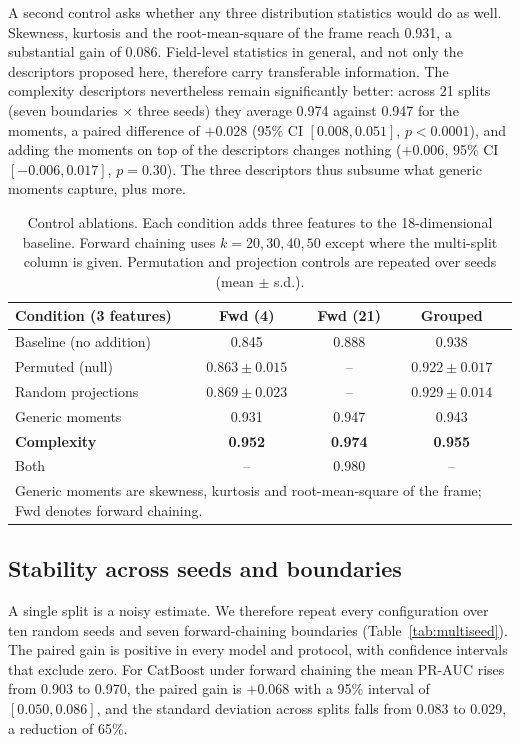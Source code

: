 \documentclass[preprint,12pt]{elsarticle}
\begin{document}
A second control asks whether any three distribution statistics would do as well. Skewness,
kurtosis and the root-mean-square of the frame reach 0.931, a substantial gain of 0.086. Field-level
statistics in general, and not only the descriptors proposed here, therefore carry transferable
information. The complexity descriptors nevertheless remain significantly better: across 21 splits
(seven boundaries $\times$ three seeds) they average 0.974 against 0.947 for the moments, a paired
difference of $+0.028$ (95\% CI $[0.008, 0.051]$, $p<0.0001$), and adding the moments on top of the
descriptors changes nothing ($+0.006$, 95\% CI $[-0.006, 0.017]$, $p=0.30$). The three descriptors
thus subsume what generic moments capture, plus more.

\begin{table}[t]
\centering
\small\setlength{\tabcolsep}{4pt}
\caption{Control ablations. Each condition adds three features to the 18-dimensional baseline.
Forward chaining uses $k=20,30,40,50$ except where the multi-split column is given.
Permutation and projection controls are repeated over seeds (mean $\pm$ s.d.).}
\label{tab:controls}
\begin{tabular}{lccc}
\toprule
Condition (3 features) & Fwd (4) & Fwd (21) & Grouped \\
\midrule
Baseline (no addition)         & 0.845 & 0.888 & 0.938 \\
Permuted (null)                & $0.863 \pm 0.015$ & -- & $0.922 \pm 0.017$ \\
Random projections             & $0.869 \pm 0.023$ & -- & $0.929 \pm 0.014$ \\
Generic moments                & 0.931 & 0.947 & 0.943 \\
\textbf{Complexity}                     & \textbf{0.952} & \textbf{0.974} & \textbf{0.955} \\
Both                           & -- & 0.980 & -- \\
\bottomrule
\multicolumn{4}{p{0.95\linewidth}}{\footnotesize Generic moments are skewness, kurtosis and root-mean-square of the frame; Fwd denotes forward chaining.}
\end{tabular}
\end{table}

\subsection{Stability across seeds and boundaries}

A single split is a noisy estimate. We therefore repeat every configuration over ten random seeds and seven forward-chaining boundaries (Table~\ref{tab:multiseed}). The paired gain is positive in every model and protocol, with confidence intervals that exclude zero. For CatBoost under forward chaining the mean PR-AUC rises from 0.903 to 0.970, the paired gain is $+0.068$ with a 95\% interval of $[0.050, 0.086]$, and the standard deviation across splits falls from 0.083 to 0.029, a reduction of 65\%.
\end{document}
